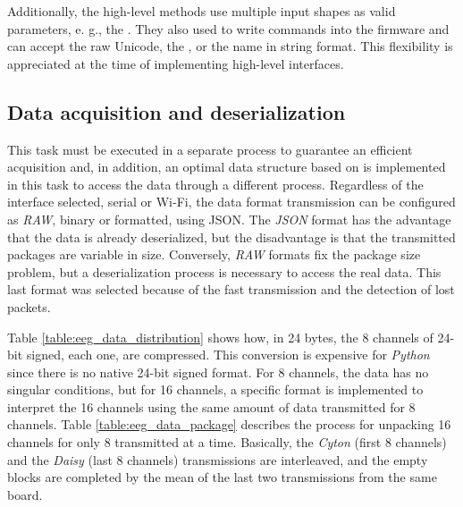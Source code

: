 

Additionally, the high-level methods use multiple input shapes as valid parameters, e. g., the . They also used to write commands into the firmware and can accept the raw Unicode, the , or the name in string format. This flexibility is appreciated at the time of implementing high-level interfaces.



\subsection{Data acquisition and deserialization}

This task must be executed in a separate process to guarantee an efficient acquisition and, in addition, an optimal data structure based on  is implemented in this task to access the data through a different process. Regardless of the interface selected, serial or Wi-Fi, the data format transmission can be configured as \textit{RAW}, binary or formatted, using \gls*{JSON}. The \textit{JSON} format has the advantage that the data is already deserialized, but the disadvantage is that the transmitted packages are variable in size. Conversely, \textit{RAW} formats fix the package size problem, but a deserialization process is necessary to access the real data. This last format was selected because of the fast transmission and the detection of lost packets. 

Table \ref{table:eeg_data_distribution} shows how, in 24 bytes, the 8 channels of 24-bit signed, each one, are compressed. This conversion is expensive for \textit{Python} since there is no native 24-bit signed format. For 8 channels, the data has no singular conditions, but for 16 channels, a specific format is implemented to interpret the 16 channels using the same amount of data transmitted for 8 channels. Table \ref{table:eeg_data_package} describes the process for unpacking 16 channels for only 8 transmitted at a time. Basically, the \textit{Cyton} (first 8 channels) and the \textit{Daisy} (last 8 channels) transmissions are interleaved, and the empty blocks are completed by the mean of the last two transmissions from the same board.





